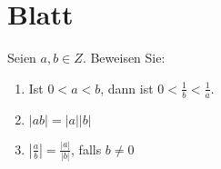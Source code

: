 \section{Blatt}

\begin{aufg}[6 Punkte]\label{kleiner}
Seien $a,b\in Z$. Beweisen Sie: 
\begin{enumerate}[label=$\mathrm{(\roman*)}$, ref=$\mathrm{\roman*}$]
\item\label{kleineri} Ist $0<a<b$, dann ist $0<\frac1b<\frac1a$.
\item $|ab| = |a||b|$
\item $\left| \frac{a}{b} \right| = \frac{|a|}{|b|}$, falls $b\not=0$
\end{enumerate}
\end{aufg}


\bigskip

